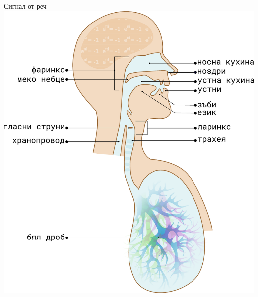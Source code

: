 \documentclass[9pt]{beamer}
\begin{document}
    \begin{frame}{Сигнал от реч}
        \includegraphics[width=0.48\paperwidth]{physics}%
        \hfill

\end{frame}
\end{document}
